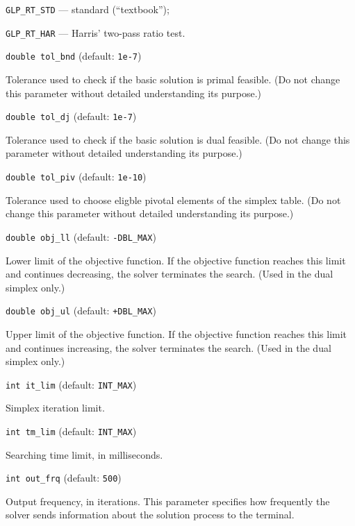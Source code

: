 \verb|GLP_RT_STD| --- standard (``textbook'');

\verb|GLP_RT_HAR| --- Harris' two-pass ratio test.

\bigskip

{\tt double tol\_bnd} (default: {\tt 1e-7})

Tolerance used to check if the basic solution is primal feasible.
(Do not change this parameter without detailed understanding its
purpose.)

\newpage

{\tt double tol\_dj} (default: {\tt 1e-7})

Tolerance used to check if the basic solution is dual feasible.
(Do not change this parameter without detailed understanding its
purpose.)

\bigskip

{\tt double tol\_piv} (default: {\tt 1e-10})

Tolerance used to choose eligble pivotal elements of the simplex table.
(Do not change this parameter without detailed understanding its
purpose.)

\bigskip

{\tt double obj\_ll} (default: {\tt -DBL\_MAX})

Lower limit of the objective function. If the objective function
reaches this limit and continues decreasing, the solver terminates the
search. (Used in the dual simplex only.)

\bigskip

{\tt double obj\_ul} (default: {\tt +DBL\_MAX})

Upper limit of the objective function. If the objective function
reaches this limit and continues increasing, the solver terminates the
search. (Used in the dual simplex only.)

\bigskip

{\tt int it\_lim} (default: {\tt INT\_MAX})

Simplex iteration limit.

\bigskip

{\tt int tm\_lim} (default: {\tt INT\_MAX})

Searching time limit, in milliseconds.

\bigskip

{\tt int out\_frq} (default: {\tt 500})

Output frequency, in iterations. This parameter specifies how
frequently the solver sends information about the solution process to
the terminal.

\bigskip

